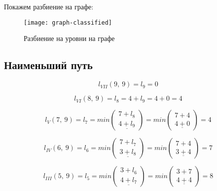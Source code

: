 Покажем разбиение на графе:

\begin{figure}[H]
\begin{center}
	\texttt{[image: graph-classified]}
	\caption{Разбиение на уровни на графе}
	\label{pic:graph-classified}
\end{center}
\end{figure}

\subsection{Наименьший путь}

\begin{equation*}
	l_{VII}(9,\ 9) = l_9 = 0
\end{equation*}

\begin{equation*}
	l_{VI}(8,\ 9) = l_8 = 4 + l_9 = 4 + 0 = 4
\end{equation*}

\begin{equation*}
	l_{V}(7,\ 9) = l_7 = min \begin{pmatrix} 7 + l_8 \\ \underline{4 + l_9} \end{pmatrix} = min \begin{pmatrix} 7 + 4 \\ \underline{4 + 0} \end{pmatrix} = 4
\end{equation*}

\begin{equation*}
	l_{IV}(6,\ 9) = l_6 = min \begin{pmatrix} 7 + l_7 \\ \underline{3 + l_8} \end{pmatrix} = min \begin{pmatrix} 7 + 4 \\ \underline{3 + 4} \end{pmatrix} = 7
\end{equation*}

\begin{equation*}
	l_{III}(5,\ 9) = l_5 = min \begin{pmatrix} 3 + l_6 \\ \underline{4 + l_7} \end{pmatrix} = min \begin{pmatrix} 3 + 7 \\ \underline{4 + 4} \end{pmatrix} = 8
\end{equation*}

